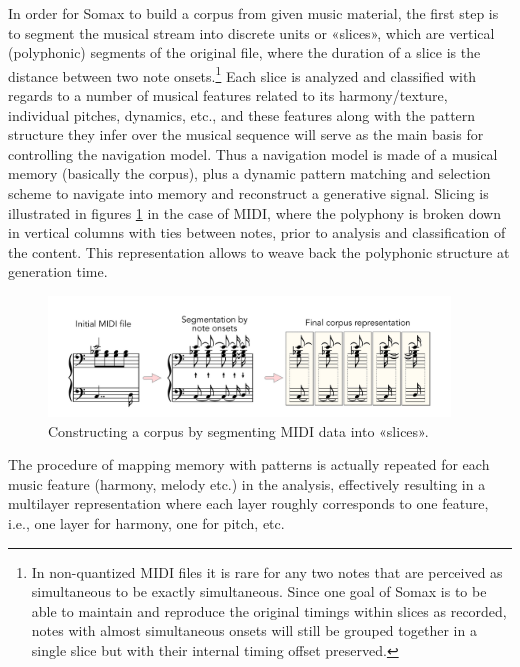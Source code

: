 In order for Somax to build a corpus from given music material, the first step is to segment the musical stream into discrete units or «slices», which are vertical (polyphonic) segments of the original file, where the duration of a slice is the distance between two note onsets.\footnote{In non-quantized MIDI files it is rare for any two notes that are perceived as simultaneous to be exactly simultaneous. Since one goal of Somax is to be able to maintain and reproduce the original timings within slices as recorded, notes with almost simultaneous onsets will still be grouped together in a single slice but with their internal timing offset preserved.} Each slice is analyzed and classified with regards to a number of musical features related to its harmony/texture, individual pitches, dynamics, etc., and these features along with the pattern structure they infer over the musical sequence will serve as the main basis for controlling the  navigation model. Thus a navigation model is made of  a musical memory (basically the corpus), plus a  dynamic pattern matching and selection  scheme to navigate into memory and reconstruct a generative signal.
Slicing is illustrated in figures \ref{fig:segmentation} in the case of MIDI, where the polyphony is broken down in vertical columns with ties between notes, prior to analysis and classification of the content. This representation allows to weave back the polyphonic structure at generation time.
 \begin{figure}[h!]
    \centering        
 	\includegraphics[width=0.95\textwidth]{img/segmentation.png}
    \caption{Constructing a corpus by segmenting MIDI data into «slices».}
    \label{fig:segmentation}
\end{figure}

The procedure of mapping  memory with patterns is actually repeated for each music feature (harmony, melody etc.) in the analysis, effectively resulting in a multilayer representation where each layer roughly corresponds to one feature, i.e., one layer for harmony, one for pitch, etc. 

